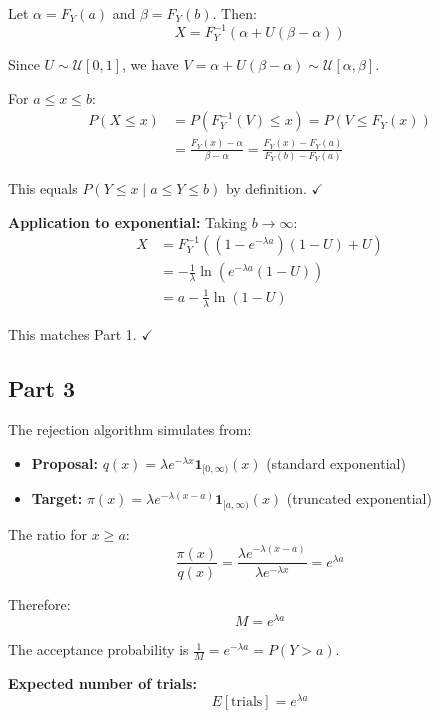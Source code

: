 Let $\alpha = F_Y(a)$ and $\beta = F_Y(b)$. Then:
\begin{equation}
X = F_Y^{-1}(\alpha + U(\beta - \alpha))
\end{equation}

Since $U \sim \mathcal{U}[0,1]$, we have $V = \alpha + U(\beta - \alpha) \sim \mathcal{U}[\alpha, \beta]$.

For $a \leq x \leq b$:
\begin{align}
P(X \leq x) &= P(F_Y^{-1}(V) \leq x) = P(V \leq F_Y(x))\\
&= \frac{F_Y(x) - \alpha}{\beta - \alpha} = \frac{F_Y(x) - F_Y(a)}{F_Y(b) - F_Y(a)}
\end{align}

This equals $P(Y \leq x \mid a \leq Y \leq b)$ by definition. $\checkmark$

\textbf{Application to exponential:} Taking $b \to \infty$:
\begin{align}
X &= F_Y^{-1}((1-e^{-\lambda a})(1-U) + U)\\
&= -\frac{1}{\lambda}\ln(e^{-\lambda a}(1-U))\\
&= a - \frac{1}{\lambda}\ln(1-U)
\end{align}

This matches Part 1. $\checkmark$

\subsection*{Part 3}
The rejection algorithm simulates from:
\begin{itemize}
\item \textbf{Proposal:} $q(x) = \lambda e^{-\lambda x} \mathbf{1}_{[0,\infty)}(x)$ (standard exponential)
\item \textbf{Target:} $\pi(x) = \lambda e^{-\lambda(x-a)} \mathbf{1}_{[a,\infty)}(x)$ (truncated exponential)
\end{itemize}

The ratio for $x \geq a$:
\begin{equation}
\frac{\pi(x)}{q(x)} = \frac{\lambda e^{-\lambda(x-a)}}{\lambda e^{-\lambda x}} = e^{\lambda a}
\end{equation}

Therefore:
\begin{equation}
M = e^{\lambda a}
\end{equation}

The acceptance probability is $\frac{1}{M} = e^{-\lambda a} = P(Y > a)$.

\textbf{Expected number of trials:}
\begin{equation}
E[\text{trials}] = e^{\lambda a}
\end{equation}

